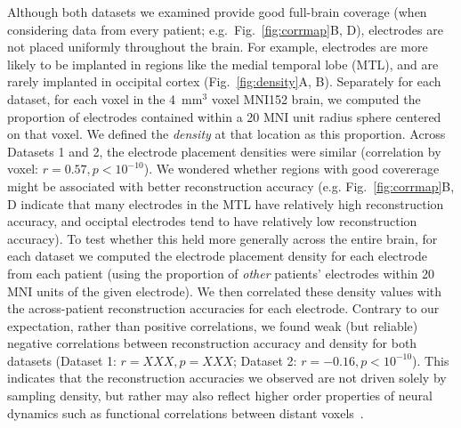 \documentclass[11pt]{article}
\begin{document}
Although both datasets we examined provide good full-brain coverage
(when considering data from every patient; e.g.\
Fig.~\ref{fig:corrmap}B, D), electrodes are not placed uniformly
throughout the brain.  For example, electrodes are more likely to be
implanted in regions like the medial temporal lobe (MTL), and are
rarely implanted in occipital cortex (Fig.~\ref{fig:density}A, B).
Separately for each dataset, for each voxel in the 4~mm$^3$ voxel
MNI152 brain, we computed the proportion of electrodes contained
within a 20 MNI unit radius sphere centered on that voxel.  We defined
the \textit{density} at that location as this proportion.  Across
Datasets 1 and 2, the electrode placement densities were similar
(correlation by voxel: $r = 0.57, p < 10^{-10}$).  We wondered whether
regions with good covererage might be associated with better
reconstruction accuracy (e.g. Fig.~\ref{fig:corrmap}B, D indicate that
many electrodes in the MTL have relatively high reconstruction
accuracy, and occiptal electrodes tend to have relatively low
reconstruction accuracy).  To test whether this held more generally
across the entire brain, for each dataset we computed the electrode
placement density for each electrode from each patient (using the
proportion of \textit{other} patients' electrodes within 20 MNI units
of the given electrode).  We then correlated these density values with
the across-patient reconstruction accuracies for each electrode.
Contrary to our expectation, rather than positive correlations, we
found weak (but reliable) negative correlations between reconstruction
accuracy and density for both datasets (Dataset 1: $r = XXX, p = XXX$;
Dataset 2: $r = -0.16, p < 10^{-10}$).  This indicates that the
reconstruction accuracies we observed are not driven solely by
sampling density, but rather may also reflect higher order properties
of neural dynamics such as functional correlations between distant
voxels~\citep{BetzEtal17b}.
\end{document}
